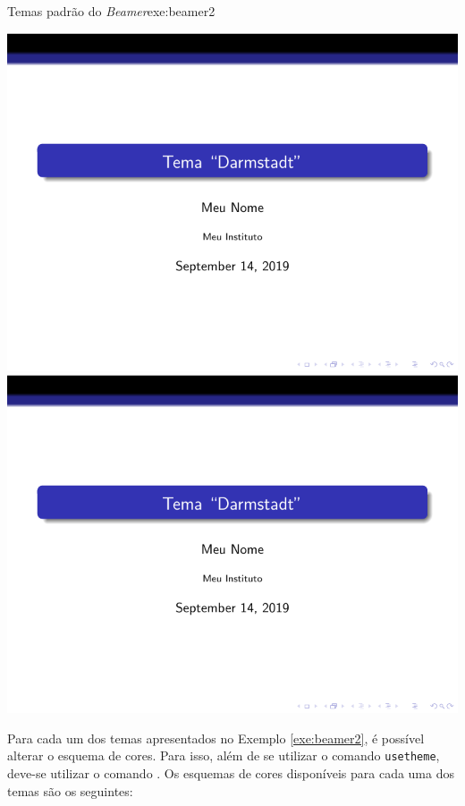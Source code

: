 \begin{texexptitled}{Temas padrão do \textit{Beamer}}{exe:beamer2}
\begin{tcbitemize}[raster columns=3,bicolor,
raster equal height,boxrule=0.1mm,
colframe=MaterialGreen900,colback=MaterialGrey50,
pdf comment]
\tcbitem[squeezed title={Szeged}]     \centering \includegraphics[scale=0.28,page=18]{./docs/figs/beamer.pdf}
\tcbitem[squeezed title={Warsaw}]     \centering \includegraphics[scale=0.28,page=19]{./docs/figs/beamer.pdf}
\end{tcbitemize}
\end{texexptitled}

Para cada um dos temas apresentados no Exemplo \ref{exe:beamer2}, é possível alterar o esquema de cores. Para isso, além de se utilizar o comando {\tt usetheme}, deve-se utilizar o comando \texttt{}. Os esquemas de cores disponíveis para cada uma dos temas são os seguintes:

